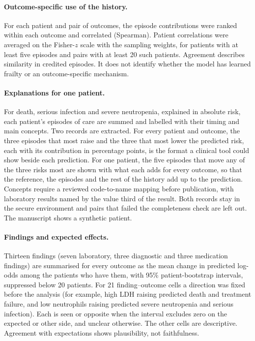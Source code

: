 \paragraph{Outcome-specific use of the history.} For each patient and pair of
outcomes, the episode contributions were ranked within each outcome and
correlated (Spearman). Patient correlations were averaged on the Fisher-$z$
scale with the sampling weights, for patients with at least five episodes and
pairs with at least 20 such patients. Agreement describes similarity in credited episodes. It does not identify
whether the model has learned frailty or an outcome-specific mechanism.

\paragraph{Explanations for one patient.} For death, serious infection and
severe neutropenia, explained in absolute risk, each patient's episodes of care
are summed and labelled with their timing and main concepts. Two records are
extracted. For every patient and outcome, the three episodes that most raise and
the three that most lower the predicted risk, each with its contribution in
percentage points, is the format a clinical tool could show beside each
prediction. For one patient, the five episodes that move any of the three risks
most are shown with what each adds for every outcome, so that the reference,
the episodes and the rest of the history add up to the prediction. Concepts require a reviewed code-to-name mapping before publication, with laboratory results named by the value
third of the result. Both records stay in the secure environment and pairs that
failed the completeness check are left out. The manuscript shows a synthetic
patient.

\paragraph{Findings and expected effects.} Thirteen findings (seven
laboratory, three diagnostic and three medication findings) are summarised for
every outcome as the mean change in predicted log-odds among the patients who
have them, with 95\% patient-bootstrap intervals, suppressed below 20 patients.
For 21 finding--outcome cells a direction was fixed before the analysis (for
example, high LDH raising predicted death and treatment failure, and low
neutrophils raising predicted severe neutropenia and serious infection). Each is
seen or opposite when the interval excludes zero on the expected or other side,
and unclear otherwise. The other cells are descriptive. Agreement with
expectations shows plausibility, not faithfulness.

